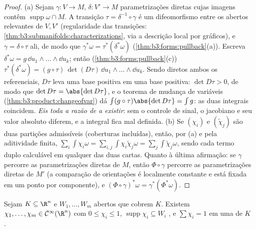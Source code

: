\begin{proof}
(a) Sejam $\gamma\colon V \to M$, $\delta\colon V' \to M$ parametrizações diretas cujas imagens contêm
$\operatorname{supp}\omega\cap M$. A transição $\tau =
\delta^{-1}\circ\gamma$ é um difeomorfismo entre os abertos relevantes
de $V, V'$ (regularidade das transições: \cref{thm:b3:submanifolds:characterizations}, via a
descrição local por gráficos), e $\gamma = \delta\circ\tau$ ali, de modo que $\gamma^*\omega = \tau^*(\delta^*\omega)$
(\cref{thm:b3:forms:pullback}(a)). Escreva $\delta^*\omega =
g\,\dd u_1\wedge\dots\wedge\dd u_k$; então (\cref{thm:b3:forms:pullback}(c)) $\tau^*(\delta^*\omega) =
(g\circ\tau)\,\det(D\tau)\,\dd u_1\wedge\dots\wedge\dd u_k$.
Sendo diretos ambos os referenciais, $D\tau$ leva uma base positiva
em uma base positiva: $\det D\tau > 0$, de modo que $\det D\tau =
\abs{\det D\tau}$, e o teorema de mudança
de variáveis (\cref{thm:b3:product:changeofvar}) dá $\int(g\circ\tau)\abs{\det D\tau} = \int g$: as duas integrais coincidem.
\emph{Eis toda a razão de a  existir}: sem o controle de
sinal, o jacobiano e seu valor absoluto diferem, e a integral fica mal
definida.
(b) Se $(\chi_i)$ e $(\tilde\chi_j)$ são duas partições admissíveis (coberturas
incluídas), então, por (a) e pela aditividade finita, $\sum_i\int\chi_i\omega =
\sum_{i,j}\int\chi_i\tilde\chi_j\omega =
\sum_j\int\tilde\chi_j\omega$, sendo cada
termo duplo calculável em qualquer das duas cartas. Quanto à última
afirmação: se $\gamma$ percorre as parametrizações diretas de
$M$, então $\Phi\circ\gamma$ percorre as parametrizações diretas de $M'$ (a
comparação de orientações é localmente constante e está fixada em um
ponto por componente), e $(\Phi\circ\gamma)^*\omega =
\gamma^*(\Phi^*\omega)$.
\end{proof}

\begin{lemma}
\label{lem:b3:forms:partition}
Sejam $K \subseteq \R^n$  e $W_1, \dots, W_m$ abertos que cobrem $K$. Existem $\chi_1, \dots, \chi_m \in
\mathcal C^\infty(\R^n)$
com $0 \leq \chi_i \leq 1$, $\operatorname{supp}\chi_i \subseteq W_i$ , e $\sum\chi_i = 1$ em uma  de
$K$.
\end{lemma}

